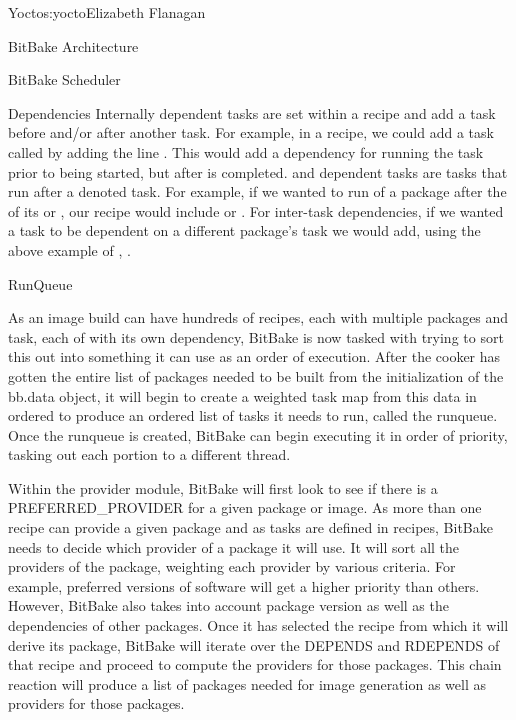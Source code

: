 \begin{aosachapter}{Yocto}{s:yocto}{Elizabeth Flanagan}
\begin{aosasect1}{BitBake Architecture}
\begin{aosasect2}{BitBake Scheduler}
\begin{aosasect3}{Dependencies}
Internally dependent tasks are set within a recipe and add a task
before and/or after another task. For example, in a recipe, we could
add a task called  by adding the line .  This would add a dependency for
running the  task prior to  being started, but
after  is completed.  and  dependent tasks
are tasks that run after a denoted task.  For example, if we wanted to
run  of a package after the  of its  or
, our recipe would include  or . For
inter-task dependencies, if we wanted a task to be dependent on a
different package's task we would add, using the above example of
, .

\end{aosasect3}

\begin{aosasect3}{RunQueue}

As an image build can have hundreds of recipes, each with multiple
packages and task, each of with its own dependency, BitBake is now
tasked with trying to sort this out into something it can use as an
order of execution. After the cooker has gotten the entire list
of packages needed to be built from the initialization of the bb.data
object, it will begin to create a weighted task map from this data in
ordered to produce an ordered list of tasks it needs to run, called
the runqueue. Once the runqueue is created, BitBake can begin
executing it in order of priority, tasking out each portion to a
different thread.

Within the provider module, BitBake will first look to see if there is
a PREFERRED\_PROVIDER for a given package or image. As more than one
recipe can provide a given package and as tasks are defined in
recipes, BitBake needs to decide which provider of a package it will
use. It will sort all the providers of the package, weighting each
provider by various criteria. For example, preferred versions of
software will get a higher priority than others. However, BitBake also
takes into account package version as well as the dependencies of
other packages. Once it has selected the recipe from which it will
derive its package, BitBake will iterate over the DEPENDS and RDEPENDS
of that recipe and proceed to compute the providers for those
packages. This chain reaction will produce a list of packages needed
for image generation as well as providers for those packages.


\end{aosasect3}
\end{aosasect2}
\end{aosasect1}
\end{aosachapter}
